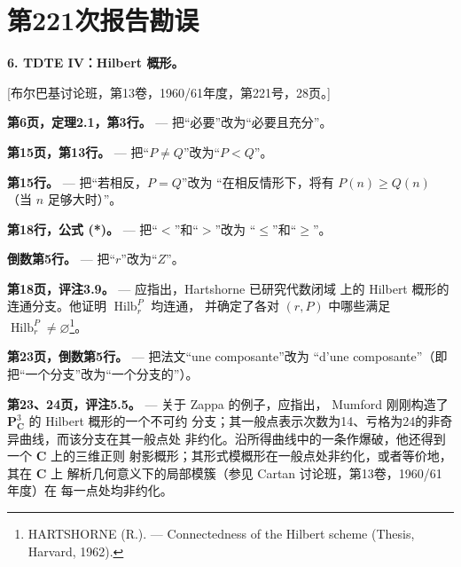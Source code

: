 \clearpage
\chapter*{第221次报告勘误}
\setcounter{footnote}{3}

\noindent\textbf{6. TDTE IV：Hilbert 概形。}

\begin{center}
[布尔巴基讨论班，第13卷，1960/61年度，第221号，28页。]
\end{center}

\noindent\textbf{第6页，定理2.1，第3行。} --- 把“必要”改为“必要且充分”。

\noindent\textbf{第15页，第13行。} --- 把“$P\neq Q$”改为“$P<Q$”。

\noindent\textbf{第15行。} --- 把“若相反，$P=Q$”改为
“在相反情形下，将有 $P(n)\geq Q(n)$（当 $n$ 足够大时）”。

\noindent\textbf{第18行，公式 (*)。} --- 把“$<$”和“$>$”改为
“$\leq$”和“$\geq$”。

\noindent\textbf{倒数第5行。} --- 把“$r$”改为“$Z$”。

\noindent\textbf{第18页，评注3.9。} --- 应指出，Hartshorne 已研究代数闭域
上的 Hilbert 概形的连通分支。他证明 $\operatorname{Hilb}^{P}_{r}$ 均连通，
并确定了各对 $(r,P)$ 中哪些满足
$\operatorname{Hilb}^{P}_{r}\neq\varnothing$\footnote{HARTSHORNE (R.). --- Connectedness of the Hilbert
scheme (Thesis, Harvard, 1962).}。

\noindent\textbf{第23页，倒数第5行。} --- 把法文“une composante”改为
“d'une composante”（即把“一个分支”改为“一个分支的”）。

\noindent\textbf{第23、24页，评注5.5。} --- 关于 Zappa 的例子，应指出，
Mumford 刚刚构造了 $\mathbf P^3_{\mathbf C}$ 的 Hilbert 概形的一个不可约
分支；其一般点表示次数为14、亏格为24的非奇异曲线，而该分支在其一般点处
非约化。沿所得曲线中的一条作爆破，他还得到一个 $\mathbf C$ 上的三维正则
射影概形；其形式模概形在一般点处非约化，或者等价地，其在 $\mathbf C$ 上
解析几何意义下的局部模簇（参见 Cartan 讨论班，第13卷，1960/61年度）在
每一点处均非约化。
